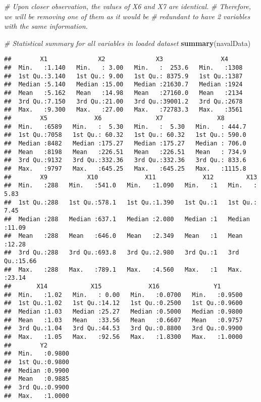 \documentclass[
]{article}
\newenvironment{Shaded}{\begin{snugshade}}{\end{snugshade}}
\newcommand{\CommentTok}[1]{\textcolor[rgb]{0.56,0.35,0.01}{\textit{#1}}}
\newcommand{\KeywordTok}[1]{\textcolor[rgb]{0.13,0.29,0.53}{\textbf{#1}}}
\newcommand{\NormalTok}[1]{#1}
\begin{document}
\begin{Shaded}
\begin{Highlighting}[]
\CommentTok{# Upon closer observation, the values of X6 and X7 are identical.}
\CommentTok{# Therefore, we will be removing one of them as it would be }
\CommentTok{# redundant to have 2 variables with the same information.}

\CommentTok{# Statistical summary for all variables in loaded dataset}
\KeywordTok{summary}\NormalTok{(navalData)   }
\end{Highlighting}
\end{Shaded}

\begin{verbatim}
##        X1              X2              X3                X4      
##  Min.   :1.140   Min.   : 3.00   Min.   :  253.6   Min.   :1308  
##  1st Qu.:3.140   1st Qu.: 9.00   1st Qu.: 8375.9   1st Qu.:1387  
##  Median :5.140   Median :15.00   Median :21630.7   Median :1924  
##  Mean   :5.162   Mean   :14.98   Mean   :27160.0   Mean   :2134  
##  3rd Qu.:7.150   3rd Qu.:21.00   3rd Qu.:39001.2   3rd Qu.:2678  
##  Max.   :9.300   Max.   :27.00   Max.   :72783.3   Max.   :3561  
##        X5             X6               X7               X8        
##  Min.   :6589   Min.   :  5.30   Min.   :  5.30   Min.   : 444.7  
##  1st Qu.:7058   1st Qu.: 60.32   1st Qu.: 60.32   1st Qu.: 590.0  
##  Median :8482   Median :175.27   Median :175.27   Median : 706.0  
##  Mean   :8198   Mean   :226.51   Mean   :226.51   Mean   : 734.9  
##  3rd Qu.:9132   3rd Qu.:332.36   3rd Qu.:332.36   3rd Qu.: 833.6  
##  Max.   :9797   Max.   :645.25   Max.   :645.25   Max.   :1115.8  
##        X9           X10             X11             X12         X13       
##  Min.   :288   Min.   :541.0   Min.   :1.090   Min.   :1   Min.   : 5.83  
##  1st Qu.:288   1st Qu.:578.1   1st Qu.:1.390   1st Qu.:1   1st Qu.: 7.45  
##  Median :288   Median :637.1   Median :2.080   Median :1   Median :11.09  
##  Mean   :288   Mean   :646.0   Mean   :2.349   Mean   :1   Mean   :12.28  
##  3rd Qu.:288   3rd Qu.:693.8   3rd Qu.:2.980   3rd Qu.:1   3rd Qu.:15.66  
##  Max.   :288   Max.   :789.1   Max.   :4.560   Max.   :1   Max.   :23.14  
##       X14            X15             X16               Y1        
##  Min.   :1.02   Min.   : 0.00   Min.   :0.0700   Min.   :0.9500  
##  1st Qu.:1.02   1st Qu.:14.12   1st Qu.:0.2500   1st Qu.:0.9600  
##  Median :1.03   Median :25.27   Median :0.5000   Median :0.9800  
##  Mean   :1.03   Mean   :33.56   Mean   :0.6607   Mean   :0.9757  
##  3rd Qu.:1.04   3rd Qu.:44.53   3rd Qu.:0.8800   3rd Qu.:0.9900  
##  Max.   :1.05   Max.   :92.56   Max.   :1.8300   Max.   :1.0000  
##        Y2        
##  Min.   :0.9800  
##  1st Qu.:0.9800  
##  Median :0.9900  
##  Mean   :0.9885  
##  3rd Qu.:0.9900  
##  Max.   :1.0000
\end{verbatim}
\end{document}

